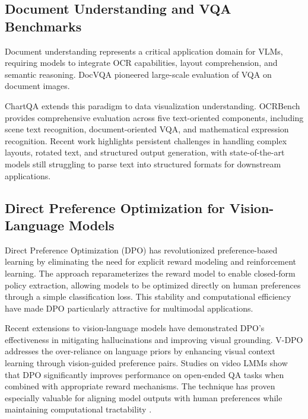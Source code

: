 \documentclass[10pt,conference,compsocconf]{IEEEtran}
\begin{document}
\subsection{Document Understanding and VQA Benchmarks}

Document understanding represents a critical application domain for VLMs, requiring models to integrate OCR capabilities, layout comprehension, and semantic reasoning. DocVQA \cite{mathew2021docvqadatasetvqadocument} pioneered large-scale evaluation of VQA on document images.

ChartQA \cite{masry2022chartqabenchmarkquestionanswering} extends this paradigm to data visualization understanding. OCRBench \cite{Liu_2024} provides comprehensive evaluation across five text-oriented components, including scene text recognition, document-oriented VQA, and mathematical expression recognition. Recent work \cite{liu2025ocrbenchv2} highlights persistent challenges in handling complex layouts, rotated text, and structured output generation, with state-of-the-art models still struggling to parse text into structured formats for downstream applications.

\subsection{Direct Preference Optimization for Vision-Language Models}

Direct Preference Optimization (DPO) \cite{rafailov2024directpreferenceoptimizationlanguage} has revolutionized preference-based learning by eliminating the need for explicit reward modeling and reinforcement learning. The approach reparameterizes the reward model to enable closed-form policy extraction, allowing models to be optimized directly on human preferences through a simple classification loss. This stability and computational efficiency have made DPO particularly attractive for multimodal applications.

Recent extensions to vision-language models have demonstrated DPO's effectiveness in mitigating hallucinations and improving visual grounding. V-DPO \cite{xie2024vdpo} addresses the over-reliance on language priors by enhancing visual context learning through vision-guided preference pairs. Studies on video LMMs \cite{zhang2024dpovideo} show that DPO significantly improves performance on open-ended QA tasks when combined with appropriate reward mechanisms. The technique has proven especially valuable for aligning model outputs with human preferences while maintaining computational tractability \cite{wallace2024diffusion}.
\end{document}
